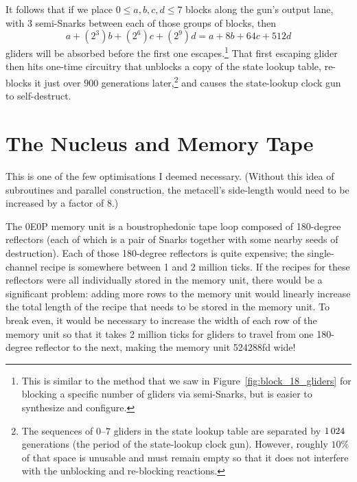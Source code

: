 It follows that if we place $0 \leq a,b,c,d \leq 7$ blocks along the gun's output lane, with $3$ semi-Snarks between each of those groups of blocks, then
\[
	a + (2^3)b + (2^6)c + (2^9)d = a + 8b + 64c + 512d
\]
gliders will be absorbed before the first one escapes.\footnote{This is similar to the method that we saw in Figure~\ref{fig:block_18_gliders} for blocking a specific number of gliders via semi-Snarks, but is easier to synthesize and configure.} That first escaping glider then hits one-time circuitry that unblocks a copy of the state lookup table, re-blocks it just over $900$ generations later,\footnote{The sequences of $0$--$7$ gliders in the state lookup table are separated by $1{\,}024$ generations (the period of the state-lookup clock gun). However, roughly $10\%$ of that space is unusable and must remain empty so that it does not interfere with the unblocking and re-blocking reactions.} and causes the state-lookup clock gun to self-destruct.


\section{The Nucleus and Memory Tape}\label{sec:0e0p_structure_nucleus}



This is one of the few optimisations I deemed necessary. (Without this idea of subroutines and parallel construction, the metacell's side-length would need to be increased by a factor of 8.)

The 0E0P memory unit is a boustrophedonic tape loop composed of 180-degree reflectors (each of which is a pair of Snarks together with some nearby seeds of destruction). Each of those 180-degree reflectors is quite expensive; the single-channel recipe is somewhere between 1 and 2 million ticks. If the recipes for these reflectors were all individually stored in the memory unit, there would be a significant problem: adding more rows to the memory unit would linearly increase the total length of the recipe that needs to be stored in the memory unit. To break even, it would be necessary to increase the width of each row of the memory unit so that it takes 2 million ticks for gliders to travel from one 180-degree reflector to the next, making the memory unit 524288fd wide!

